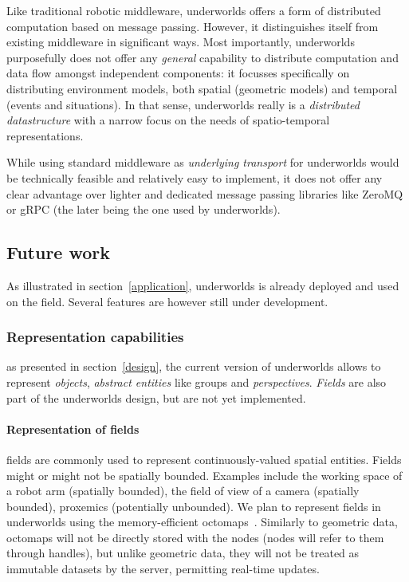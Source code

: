 \documentclass[letterpaper, 10pt, conference]{ieeeconf}
\newcommand{\uwds}{{\sc underworlds}\xspace}
\begin{document}
Like traditional robotic middleware, \uwds offers a form of distributed
computation based on message passing. However, it distinguishes itself from
existing middleware in significant ways. Most importantly, \uwds purposefully
does not offer any \emph{general} capability to distribute computation and data
flow amongst independent components: it focusses specifically on distributing
environment models, both spatial (geometric models) and temporal (events and
situations). In that sense, \uwds really is a \emph{distributed datastructure}
with a narrow focus on the needs of spatio-temporal representations.

While using standard middleware as \emph{underlying transport} for \uwds would be
technically feasible and relatively easy to implement, it does not offer any
clear advantage over lighter and dedicated message passing libraries like ZeroMQ
or gRPC (the later being the one used by \uwds).

\subsection{Future work}
\label{futurework}

As illustrated in section~\ref{application}, \uwds is already deployed and used
on the field. Several features are however still under development.

\subsubsection{Representation capabilities} as presented in
section~\ref{design}, the current version of \uwds allows to represent
\emph{objects}, \emph{abstract entities} like groups and \emph{perspectives}.
\emph{Fields} are also part of the \uwds design, but are not yet implemented.

\paragraph*{Representation of fields} fields are commonly used to represent
continuously-valued spatial entities. Fields might or might not be spatially
bounded. Examples include the working space of a robot arm (spatially bounded),
the field of view of a camera (spatially bounded), proxemics (potentially
unbounded). We plan to represent fields in \uwds using the memory-efficient
octomaps~\cite{hornung2013octomap}. Similarly to geometric data, octomaps
will not be directly stored with the nodes (nodes will refer to them through 
handles), but unlike geometric data, they will not be treated as immutable
datasets by the server, permitting real-time updates.
\end{document}
